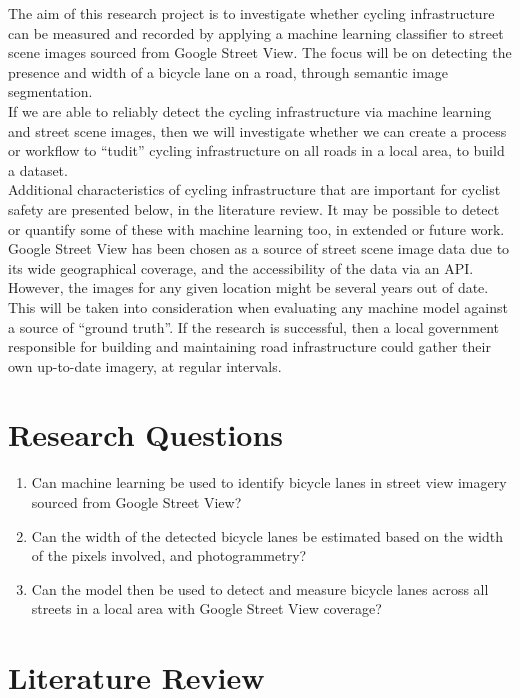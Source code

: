 \documentclass{article}
\begin{document}
The aim of this research project is to investigate whether cycling infrastructure can be measured and recorded by applying a machine learning classifier to street scene images sourced from Google Street View.  The focus will be on detecting the presence and width of a bicycle lane on a road, through semantic image segmentation.
\\

If we are able to reliably detect the cycling infrastructure via machine learning and street scene images, then we will investigate whether we can create a process or workflow to ``tudit'' cycling infrastructure on all roads in a local area, to build a dataset. \\

Additional characteristics of cycling infrastructure that are important for cyclist safety are presented below, in the literature review.  It may be possible to detect or quantify some of these with machine learning too, in extended or future work. \\

Google Street View has been chosen as a source of street scene image data due to its wide geographical coverage, and the accessibility of the data via an API.  However, the images for any given location might be several years out of date.  This will be taken into consideration when evaluating any machine model against a source of ``ground truth''.  If the research is successful, then a local government responsible for building and maintaining road infrastructure could gather their own up-to-date imagery, at regular intervals.

\section{Research Questions}
\begin{enumerate}
\item{Can machine learning be used to identify bicycle lanes in street view imagery sourced from Google Street View?}
\item{Can the width of the detected bicycle lanes be estimated based on the width of the pixels involved, and photogrammetry?}
\item{Can the model then be used to detect and measure bicycle lanes across all streets in a local area with Google Street View coverage?}	
\end{enumerate}

\cleardoublepage

\section{Literature Review}
\end{document}
